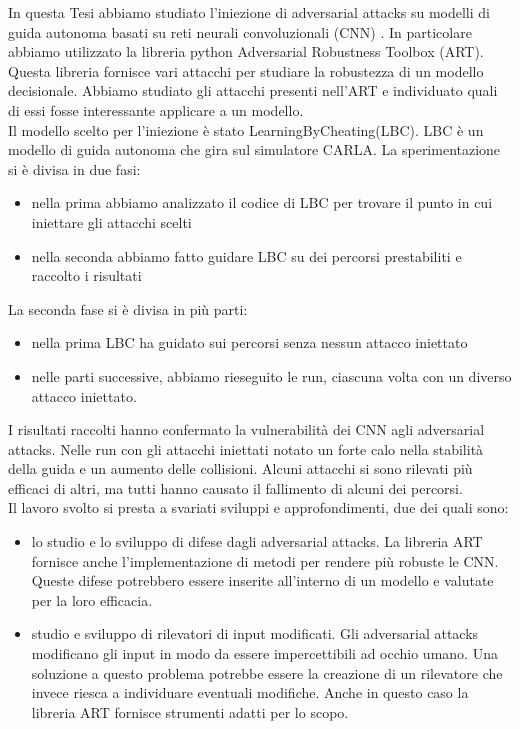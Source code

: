 In questa Tesi abbiamo studiato l'iniezione di adversarial attacks su modelli di guida autonoma basati su reti neurali convoluzionali (CNN) \cite{art2018}. In particolare
abbiamo utilizzato la libreria python Adversarial Robustness Toolbox (ART). Questa libreria fornisce vari attacchi per studiare la robustezza di un
modello decisionale. Abbiamo studiato gli attacchi presenti nell'ART  e individuato quali di essi fosse interessante applicare a un modello.\\

Il  modello  scelto per l'iniezione è stato LearningByCheating(LBC). LBC è un modello di guida autonoma che gira sul simulatore 
CARLA. La sperimentazione si è divisa in due fasi:\begin{itemize}
    \item nella prima abbiamo analizzato il codice di LBC per trovare il punto  in cui iniettare gli attacchi scelti
    \item nella seconda abbiamo fatto guidare LBC su dei percorsi prestabiliti e raccolto i risultati
\end{itemize} 

La seconda fase si è divisa in più parti:\begin{itemize}
    \item nella prima LBC ha guidato sui percorsi senza nessun attacco iniettato
    \item nelle parti successive, abbiamo rieseguito le run, ciascuna volta con un diverso attacco iniettato.
\end{itemize}

I risultati raccolti hanno confermato la vulnerabilità dei CNN agli adversarial attacks. Nelle run con gli attacchi iniettati notato un forte calo nella stabilità della guida e un aumento delle collisioni.
Alcuni attacchi si sono rilevati più efficaci di altri, ma tutti hanno causato il fallimento di alcuni dei percorsi.\\

Il lavoro svolto si presta a svariati sviluppi e approfondimenti, due  dei quali sono:\begin{itemize}
    \item lo studio e lo sviluppo di difese dagli adversarial attacks. La libreria ART fornisce anche l'implementazione di metodi per rendere più robuste le CNN.
    Queste difese potrebbero essere inserite all'interno di un modello e valutate per la loro efficacia.
    \item studio e sviluppo di rilevatori di input modificati. Gli adversarial attacks modificano gli input in modo da essere impercettibili ad occhio umano. Una 
    soluzione a questo problema potrebbe essere la creazione di un rilevatore che invece riesca a individuare eventuali modifiche. Anche in questo caso
    la libreria ART  fornisce strumenti adatti per lo scopo.
\end{itemize}